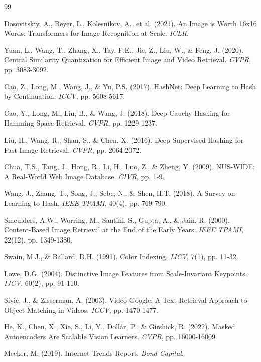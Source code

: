 \documentclass[12pt,a4paper]{article}
\begin{document}
\newpage
\begin{thebibliography}{99}

Dosovitskiy, A., Beyer, L., Kolesnikov, A., et al. (2021). 
An Image is Worth 16x16 Words: Transformers for Image Recognition at Scale. 
\textit{ICLR}.

Yuan, L., Wang, T., Zhang, X., Tay, F.E., Jie, Z., Liu, W., \& Feng, J. (2020). 
Central Similarity Quantization for Efficient Image and Video Retrieval. 
\textit{CVPR}, pp. 3083-3092.

Cao, Z., Long, M., Wang, J., \& Yu, P.S. (2017). 
HashNet: Deep Learning to Hash by Continuation. 
\textit{ICCV}, pp. 5608-5617.

Cao, Y., Long, M., Liu, B., \& Wang, J. (2018). 
Deep Cauchy Hashing for Hamming Space Retrieval. 
\textit{CVPR}, pp. 1229-1237.

Liu, H., Wang, R., Shan, S., \& Chen, X. (2016). 
Deep Supervised Hashing for Fast Image Retrieval. 
\textit{CVPR}, pp. 2064-2072.

Chua, T.S., Tang, J., Hong, R., Li, H., Luo, Z., \& Zheng, Y. (2009). 
NUS-WIDE: A Real-World Web Image Database. 
\textit{CIVR}, pp. 1-9.

Wang, J., Zhang, T., Song, J., Sebe, N., \& Shen, H.T. (2018). 
A Survey on Learning to Hash. 
\textit{IEEE TPAMI}, 40(4), pp. 769-790.

Smeulders, A.W., Worring, M., Santini, S., Gupta, A., \& Jain, R. (2000). 
Content-Based Image Retrieval at the End of the Early Years. 
\textit{IEEE TPAMI}, 22(12), pp. 1349-1380.

Swain, M.J., \& Ballard, D.H. (1991). 
Color Indexing. 
\textit{IJCV}, 7(1), pp. 11-32.

Lowe, D.G. (2004). 
Distinctive Image Features from Scale-Invariant Keypoints. 
\textit{IJCV}, 60(2), pp. 91-110.

Sivic, J., \& Zisserman, A. (2003). 
Video Google: A Text Retrieval Approach to Object Matching in Videos. 
\textit{ICCV}, pp. 1470-1477.

He, K., Chen, X., Xie, S., Li, Y., Dollár, P., \& Girshick, R. (2022). 
Masked Autoencoders Are Scalable Vision Learners. 
\textit{CVPR}, pp. 16000-16009.

Meeker, M. (2019). 
Internet Trends Report.
\textit{Bond Capital}.


\end{thebibliography}
\end{document}
